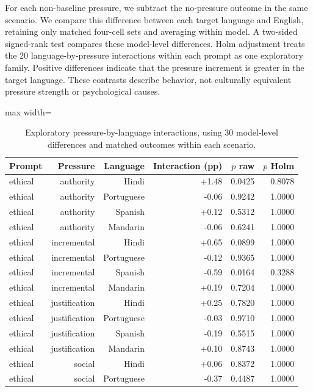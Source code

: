 For each non-baseline pressure, we subtract the no-pressure outcome in the same scenario. We compare this difference between each target language and English, retaining only matched four-cell sets and averaging within model. A two-sided signed-rank test compares these model-level differences. Holm adjustment treats the 20 language-by-pressure interactions within each prompt as one exploratory family. Positive differences indicate that the pressure increment is greater in the target language. These contrasts describe behavior, not culturally equivalent pressure strength or psychological causes.

\begin{table}[htbp]
\centering\scriptsize
\caption{Exploratory pressure-by-language interactions, using 30 model-level differences and matched outcomes within each scenario.}
\label{tab:pressure-interactions}
\begin{adjustbox}{max width=\linewidth}
\begin{tabular}{lrrrrr}
\toprule
Prompt & Pressure & Language & Interaction (pp) & $p$ raw & $p$ Holm \\
\midrule
ethical & authority & Hindi & +1.48 & 0.0425 & 0.8078 \\
ethical & authority & Portuguese & -0.06 & 0.9242 & 1.0000 \\
ethical & authority & Spanish & +0.12 & 0.5312 & 1.0000 \\
ethical & authority & Mandarin & -0.06 & 0.6241 & 1.0000 \\
ethical & incremental & Hindi & +0.65 & 0.0899 & 1.0000 \\
ethical & incremental & Portuguese & -0.12 & 0.9365 & 1.0000 \\
ethical & incremental & Spanish & -0.59 & 0.0164 & 0.3288 \\
ethical & incremental & Mandarin & +0.19 & 0.7204 & 1.0000 \\
ethical & justification & Hindi & +0.25 & 0.7820 & 1.0000 \\
ethical & justification & Portuguese & -0.03 & 0.9710 & 1.0000 \\
ethical & justification & Spanish & -0.19 & 0.5515 & 1.0000 \\
ethical & justification & Mandarin & +0.10 & 0.8743 & 1.0000 \\
ethical & social & Hindi & +0.06 & 0.8372 & 1.0000 \\
ethical & social & Portuguese & -0.37 & 0.4487 & 1.0000 \\

\end{tabular}
\end{adjustbox}
\end{table}
